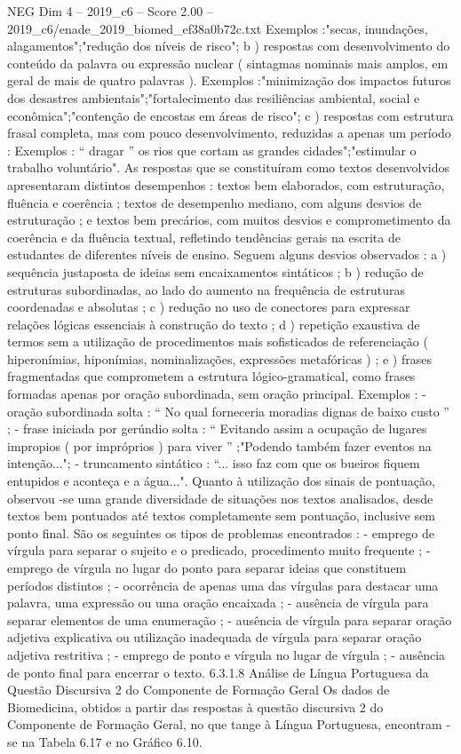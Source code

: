 \begin{textsample}{NEG Dim 4 – 2019\_c6 – Score 2.00 – 2019\_c6/enade\_2019\_biomed\_ef38a0b72c.txt}
Exemplos :"secas, inundações, alagamentos";"redução dos níveis de risco"; b ) respostas com desenvolvimento do conteúdo da palavra ou expressão nuclear ( sintagmas nominais mais amplos, em geral de mais de quatro palavras ).
Exemplos :"minimização dos impactos futuros dos desastres ambientais";"fortalecimento das resiliências ambiental, social e econômica";"contenção de encostas em áreas de risco"; c ) respostas com estrutura frasal completa, mas com pouco desenvolvimento, reduzidas a apenas um período : Exemplos : “ dragar ” os rios que cortam as grandes cidades";"estimular o trabalho voluntário".
As respostas que se constituíram como textos desenvolvidos apresentaram distintos desempenhos : textos bem elaborados, com estruturação, fluência e coerência ; textos de desempenho mediano, com alguns desvios de estruturação ; e textos bem precários, com muitos desvios e comprometimento da coerência e da fluência textual, refletindo tendências gerais na escrita de estudantes de diferentes níveis de ensino.
Seguem alguns desvios observados : a ) sequência justaposta de ideias sem encaixamentos sintáticos ; b ) redução de estruturas subordinadas, ao lado do aumento na frequência de estruturas coordenadas e absolutas ; c ) redução no uso de conectores para expressar relações lógicas essenciais à construção do texto ; d ) repetição exaustiva de termos sem a utilização de procedimentos mais sofisticados de referenciação ( hiperonímias, hiponímias, nominalizações, expressões metafóricas ) ; e ) frases fragmentadas que comprometem a estrutura lógico-gramatical, como frases formadas apenas por oração subordinada, sem oração principal.
Exemplos : - oração subordinada solta : “ No qual forneceria moradias dignas de baixo custo ” ; - frase iniciada por gerúndio solta : “ Evitando assim a ocupação de lugares impropios ( por impróprios ) para viver ” ;"Podendo também fazer eventos na intenção..."; - truncamento sintático : “... isso faz com que os bueiros fiquem entupidos e aconteça e a água...".
Quanto à utilização dos sinais de pontuação, observou -se uma grande diversidade de situações nos textos analisados, desde textos bem pontuados até textos completamente sem pontuação, inclusive sem ponto final.
São os seguintes os tipos de problemas encontrados : - emprego de vírgula para separar o sujeito e o predicado, procedimento muito frequente ; - emprego de vírgula no lugar do ponto para separar ideias que constituem períodos distintos ; - ocorrência de apenas uma das vírgulas para destacar uma palavra, uma expressão ou uma oração encaixada ; - ausência de vírgula para separar elementos de uma enumeração ; - ausência de vírgula para separar oração adjetiva explicativa ou utilização inadequada de vírgula para separar oração adjetiva restritiva ; - emprego de ponto e vírgula no lugar de vírgula ; - ausência de ponto final para encerrar o texto. 6.3.1.8 Análise de Língua Portuguesa da Questão Discursiva 2 do Componente de Formação Geral Os dados de Biomedicina, obtidos a partir das respostas à questão discursiva 2 do Componente de Formação Geral, no que tange à Língua Portuguesa, encontram -se na Tabela 6.17 e no Gráfico 6.10.

\end{textsample}
